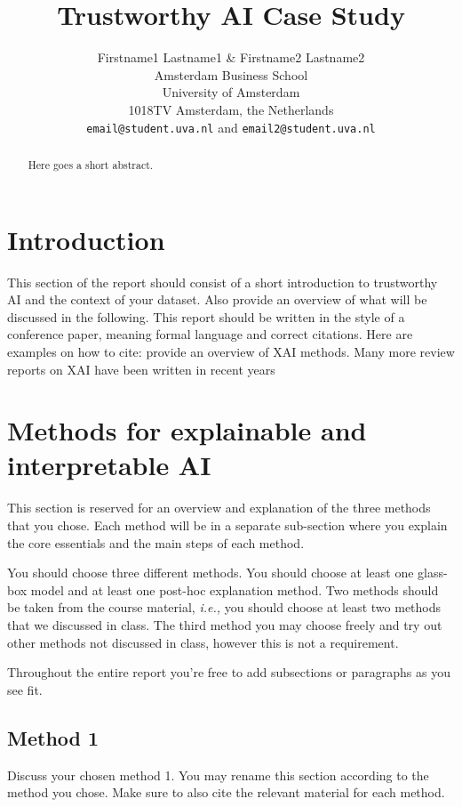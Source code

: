 \documentclass[twocolumn]{article}
\title{Trustworthy AI Case Study}
\author{
 Firstname1 Lastname1 \& Firstname2 Lastname2\\
  Amsterdam Business School \\
  University of Amsterdam\\
  1018TV Amsterdam, the Netherlands\\
  \texttt{email@student.uva.nl} and \texttt{email2@student.uva.nl}\\
}
\begin{document}
\maketitle

\begin{abstract}
Here goes a short abstract.
\end{abstract}

\section{Introduction}

This section of the report should consist of a short introduction to trustworthy AI and the context of your dataset. Also provide an overview of what will be discussed in the following. This report should be written in the style of a conference paper, meaning formal language and correct citations. Here are examples on how to cite: \cite{barredo-arrieta2020_review} provide an overview of XAI methods. Many more review reports on XAI have been written in recent years \citep[\textit{e.g.,}][]{ali2023_review, guidotti2018_review}


\section{Methods for explainable and interpretable AI}

This section is reserved for an overview and explanation of the three methods that you chose. Each method will be in a separate sub-section where you explain the core essentials and the main steps of each method.

You should choose three different methods. You should choose at least one glass-box model and at least one post-hoc explanation method. Two methods should be taken from the course material, \textit{i.e.,} you should choose at least two methods that we discussed in class. The third method you may choose freely and try out other methods not discussed in class, however this is not a requirement.

Throughout the entire report you're free to add subsections or paragraphs as you see fit. 

\subsection{Method 1}

Discuss your chosen method 1. You may rename this section according to the method you chose. Make sure to also cite the relevant material for each method. 
\end{document}
